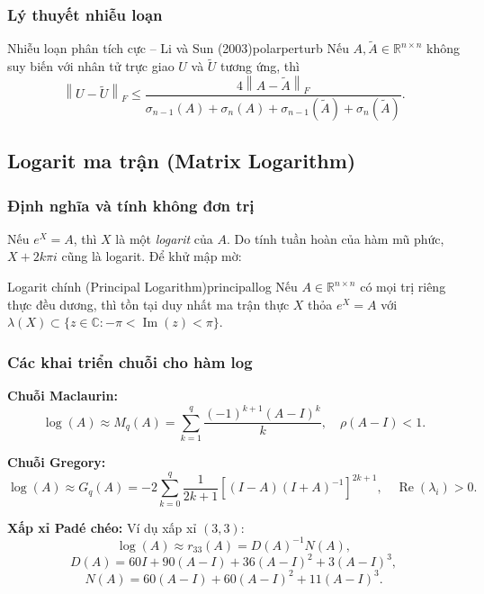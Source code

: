 \documentclass[12pt,a4paper]{report}
\newcommand{\R}{\mathbb{R}}
\newcommand{\C}{\mathbb{C}}
\newcommand{\norm}[1]{\left\lVert #1 \right\rVert}
\DeclareMathOperator{\re}{Re}
\DeclareMathOperator{\im}{Im}
\begin{document}
\subsubsection{Lý thuyết nhiễu loạn}

\newpage
\begin{theorem}{Nhiễu loạn phân tích cực -- Li và Sun (2003)}{polarperturb}
Nếu $A, \tilde{A} \in \R^{n\times n}$ không suy biến với nhân tử trực giao $U$ và
$\tilde{U}$ tương ứng, thì
\[
  \norm{U - \tilde{U}}_F
  \le \frac{4\norm{A - \tilde{A}}_F}
           {\sigma_{n-1}(A) + \sigma_n(A) + \sigma_{n-1}(\tilde{A}) + \sigma_n(\tilde{A})}.
\]
\end{theorem}

\subsection{Logarit ma trận (Matrix Logarithm)}

\subsubsection{Định nghĩa và tính không đơn trị}

Nếu $e^X = A$, thì $X$ là một \emph{logarit} của $A$. Do tính tuần hoàn của hàm mũ
phức, $X + 2k\pi i$ cũng là logarit. Để khử mập mờ:

\begin{definition}{Logarit chính (Principal Logarithm)}{principallog}
Nếu $A \in \R^{n\times n}$ có mọi trị riêng thực đều dương, thì tồn tại duy nhất
ma trận thực $X$ thỏa $e^X = A$ với $\lambda(X) \subset \{z \in \C: -\pi < \im(z) < \pi\}$.
\end{definition}

\subsubsection{Các khai triển chuỗi cho hàm log}

\textbf{Chuỗi Maclaurin:}
\[
  \log(A) \approx M_q(A) = \sum_{k=1}^{q} \frac{(-1)^{k+1}(A-I)^k}{k},
  \quad \rho(A-I) < 1.
\]

\textbf{Chuỗi Gregory:}
\[
  \log(A) \approx G_q(A) = -2\sum_{k=0}^{q} \frac{1}{2k+1}
  \left[(I-A)(I+A)^{-1}\right]^{2k+1},
  \quad \re(\lambda_i) > 0.
\]

\textbf{Xấp xỉ Padé chéo:} Ví dụ xấp xỉ $(3,3)$:
\[
  \log(A) \approx r_{33}(A) = D(A)^{-1} N(A),
\]
\[
  D(A) = 60I + 90(A-I) + 36(A-I)^2 + 3(A-I)^3,
\]
\[
  N(A) = 60(A-I) + 60(A-I)^2 + 11(A-I)^3.
\]
\end{document}
